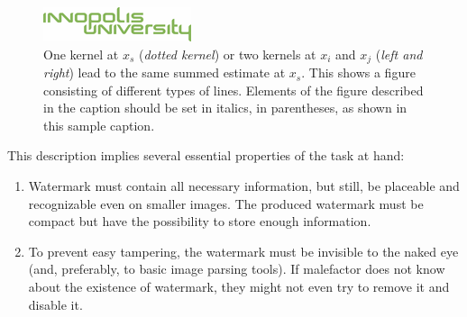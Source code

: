 \begin{figure}[hbt]
    \centering
    \includegraphics[]{figs/inno.png}
    \caption{One kernel at $x_s$ (\emph{dotted kernel}) or two kernels at
        $x_i$ and $x_j$ (\textit{left and right}) lead to the same summed estimate
        at $x_s$. This shows a figure consisting of different types of
        lines. Elements of the figure described in the caption should be set in
        italics, in parentheses, as shown in this sample caption.}
    \label{fig:secex}
\end{figure}

This description implies several essential properties of the task at hand:
\begin{enumerate}
    \item Watermark must contain all necessary information, but still, be placeable and recognizable even on smaller images. The produced watermark must be compact but have the possibility to store enough information.
    \item To prevent easy tampering, the watermark must be invisible to the naked eye (and, preferably, to basic image parsing tools). If malefactor does not know about the existence of watermark, they might not even try to remove it and disable it.
\end{enumerate}
